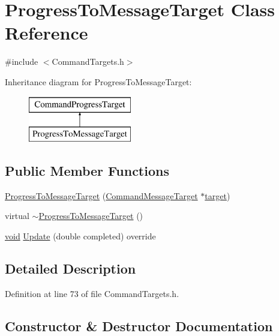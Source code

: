 \hypertarget{class_progress_to_message_target}{}\section{Progress\+To\+Message\+Target Class Reference}
\label{class_progress_to_message_target}


{\ttfamily \#include $<$Command\+Targets.\+h$>$}

Inheritance diagram for Progress\+To\+Message\+Target\+:\begin{figure}[H]
\begin{center}
\leavevmode
\includegraphics[height=2.000000cm]{class_progress_to_message_target}
\end{center}
\end{figure}
\subsection*{Public Member Functions}
\begin{DoxyCompactItemize}
\item 
\hyperlink{class_progress_to_message_target_a097d1310d7a38346bb6e77be99b3b0bf}{Progress\+To\+Message\+Target} (\hyperlink{class_command_message_target}{Command\+Message\+Target} $\ast$\hyperlink{lib_2expat_8h_a15a257516a87decb971420e718853137}{target})
\item 
virtual \hyperlink{class_progress_to_message_target_a9bc14666d8078227b9237b20dc0d8ea6}{$\sim$\+Progress\+To\+Message\+Target} ()
\item 
\hyperlink{sound_8c_ae35f5844602719cf66324f4de2a658b3}{void} \hyperlink{class_progress_to_message_target_a24bf7a78466eafc73cde1a3488e7f617}{Update} (double completed) override
\end{DoxyCompactItemize}


\subsection{Detailed Description}


Definition at line 73 of file Command\+Targets.\+h.



\subsection{Constructor \& Destructor Documentation}
